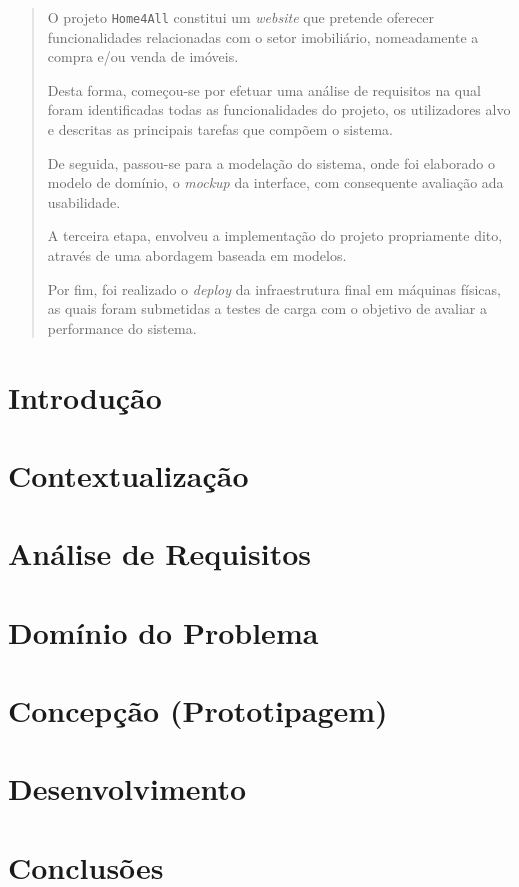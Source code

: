 \documentclass[a4paper]{article}
\begin{document}
\begin{abstract}
O projeto \texttt{Home4All} constitui um \textit{website} que pretende oferecer funcionalidades relacionadas com o setor imobiliário, nomeadamente a compra e/ou venda de imóveis. 

Desta forma, começou-se por efetuar uma análise de requisitos na qual foram identificadas todas as funcionalidades do projeto, os utilizadores alvo e descritas as principais tarefas que compõem o sistema.

De seguida, passou-se para a modelação do sistema, onde foi elaborado o modelo de domínio, o \textit{mockup} da interface, com consequente avaliação ada usabilidade.

A terceira etapa, envolveu a implementação do projeto propriamente dito, através de uma abordagem baseada em modelos.

Por fim, foi realizado o \textit{deploy} da infraestrutura final em máquinas físicas, as quais foram submetidas a testes de carga com o objetivo de avaliar a performance do sistema.
\end{abstract}

\pagebreak
\tableofcontents


\pagebreak
\section{Introdução}
\label{sec:introducao}


\pagebreak
\section{Contextualização}
\label{sec:contextualizacao}


\pagebreak
\section{Análise de Requisitos}
\label{sec:requisitos}


\pagebreak
\section{Domínio do Problema}
\label{sec:dominio}


\pagebreak
\section{Concepção (Prototipagem)}
\label{sec:concepcao}


\pagebreak
\section{Desenvolvimento}
\label{sec:desenvolvimento}


\pagebreak
\section{Conclusões}
\label{sec:conclusoes}

\end{document}
